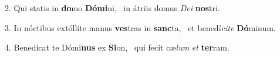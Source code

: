 2. Qui statis in \textbf{do}mo \textbf{Dó}\textbf{mi}ni, \ast\  in átriis domus \textit{De}\textit{i} \textbf{nos}tri.\

3. In nóctibus extóllite manus \textbf{ves}tras in \textbf{sanc}ta, \ast\  et benedí\textit{ci}\textit{te} \textbf{Dó}minum.\

4. Benedícat te Dómi\textbf{nus} ex \textbf{Si}on, \ast\  qui fecit cæ\textit{lum} \textit{et} \textbf{ter}ram.\

